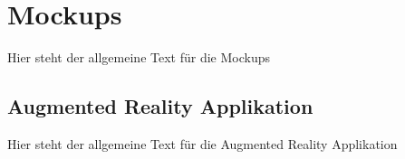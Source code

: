 \chapter{Mockups}
Hier steht der allgemeine Text für die Mockups

\section{Augmented Reality Applikation}
Hier steht der allgemeine Text für die Augmented Reality Applikation
